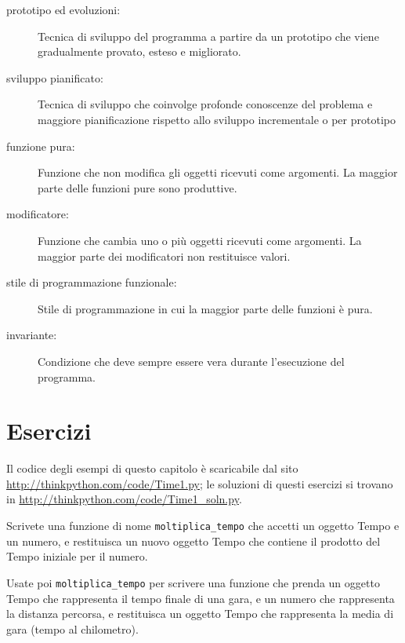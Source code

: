 \documentclass[10pt]{book}
\begin{document}
\begin{description}

\item[prototipo ed evoluzioni:] Tecnica di sviluppo del programma a partire da un prototipo che viene gradualmente provato, esteso e migliorato.

\item[sviluppo pianificato:] Tecnica di sviluppo che coinvolge profonde conoscenze del problema e maggiore pianificazione rispetto allo sviluppo incrementale o per prototipo

\item[funzione pura:] Funzione che non modifica gli oggetti ricevuti come argomenti. La maggior parte delle funzioni pure sono produttive.

\item[modificatore:] Funzione che cambia uno o più oggetti ricevuti come argomenti. La maggior parte dei modificatori non restituisce valori.

\item[stile di programmazione funzionale:] Stile di programmazione in cui la maggior parte delle funzioni è pura.

\item[invariante:] Condizione che deve sempre essere vera durante l'esecuzione del programma.

\end{description}


\section{Esercizi}

Il codice degli esempi di questo capitolo è scaricabile dal sito
\url{http://thinkpython.com/code/Time1.py}; le soluzioni di questi esercizi si trovano in \url{http://thinkpython.com/code/Time1_soln.py}.

\vspace{0.2in}
\begin{exercise}

Scrivete una funzione di nome \verb"moltiplica_tempo" che accetti un oggetto Tempo e un numero, e restituisca un nuovo oggetto Tempo che contiene il prodotto del Tempo iniziale per il numero.

Usate poi \verb"moltiplica_tempo" per scrivere una funzione che prenda un oggetto Tempo che rappresenta il tempo finale di una gara, e un numero che rappresenta la distanza percorsa, e restituisca un oggetto Tempo che rappresenta la media di gara (tempo al chilometro).

\end{exercise}
\end{document}
